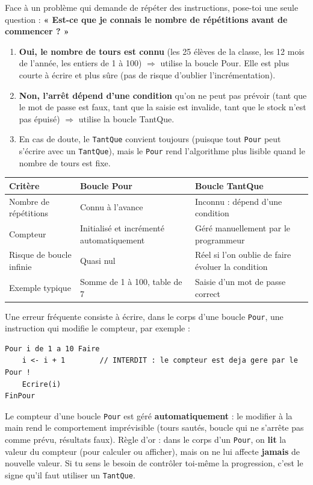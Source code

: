 \documentclass[11pt]{article}
\newcommand{\cle}[1]{{\popxbold\color{popdark}#1}}
\begin{document}
\begin{methode}
Face à un problème qui demande de répéter des instructions, pose-toi une seule question : \textbf{« Est-ce que je connais le nombre de répétitions avant de commencer ? »}
\begin{enumerate}
  \item \textbf{Oui, le nombre de tours est connu} (les 25 élèves de la classe, les 12 mois de l'année, les entiers de 1 à 100) $\Rightarrow$ utilise la boucle \cle{Pour}. Elle est plus courte à écrire et plus sûre (pas de risque d'oublier l'incrémentation).
  \item \textbf{Non, l'arrêt dépend d'une condition} qu'on ne peut pas prévoir (tant que le mot de passe est faux, tant que la saisie est invalide, tant que le stock n'est pas épuisé) $\Rightarrow$ utilise la boucle \cle{TantQue}.
  \item En cas de doute, le \texttt{TantQue} convient toujours (puisque tout \texttt{Pour} peut s'écrire avec un \texttt{TantQue}), mais le \texttt{Pour} rend l'algorithme plus lisible quand le nombre de tours est fixe.
\end{enumerate}
\end{methode}

\begin{center}
\begin{tabularx}{\linewidth}{|l|X|X|}
\hline
\rowcolor{popblueL} \textbf{Critère} & \textbf{Boucle Pour} & \textbf{Boucle TantQue} \\
\hline
Nombre de répétitions & Connu à l'avance & Inconnu : dépend d'une condition \\
\hline
Compteur & Initialisé et incrémenté automatiquement & Géré manuellement par le programmeur \\
\hline
Risque de boucle infinie & Quasi nul & Réel si l'on oublie de faire évoluer la condition \\
\hline
Exemple typique & Somme de 1 à 100, table de 7 & Saisie d'un mot de passe correct \\
\hline
\end{tabularx}
\end{center}

\begin{attention}
Une erreur fréquente consiste à écrire, dans le corps d'une boucle \texttt{Pour}, une instruction qui modifie le compteur, par exemple :
\begin{lstlisting}
Pour i de 1 a 10 Faire
    i <- i + 1        // INTERDIT : le compteur est deja gere par le Pour !
    Ecrire(i)
FinPour
\end{lstlisting}
Le compteur d'une boucle \texttt{Pour} est géré \textbf{automatiquement} : le modifier à la main rend le comportement imprévisible (tours sautés, boucle qui ne s'arrête pas comme prévu, résultats faux). Règle d'or : dans le corps d'un \texttt{Pour}, on \textbf{lit} la valeur du compteur (pour calculer ou afficher), mais on ne lui affecte \textbf{jamais} de nouvelle valeur. Si tu sens le besoin de contrôler toi-même la progression, c'est le signe qu'il faut utiliser un \texttt{TantQue}.
\end{attention}
\end{document}
